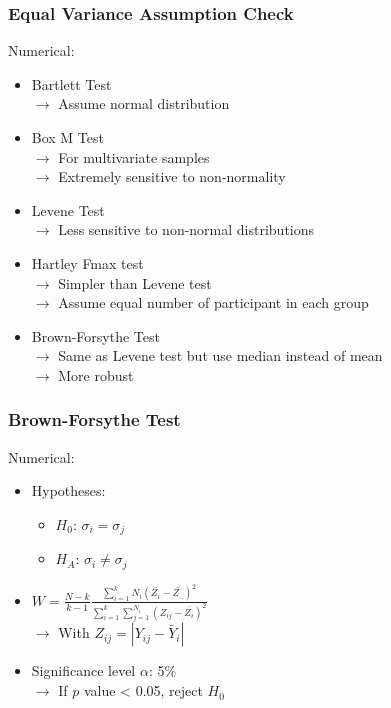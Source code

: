 \documentclass[xcolor=table]{beamer}
\begin{document}
\begin{frame}
	\frametitle{Equal Variance Assumption Check}
	Numerical:
	\begin{itemize}[label=$\bullet$]
		\item Bartlett Test\\
		$ \rightarrow $ Assume normal distribution
		\item Box M Test\\
		$ \rightarrow $ For multivariate samples\\
		$ \rightarrow $ Extremely sensitive to non-normality
		\item Levene Test\\
		$ \rightarrow $ Less sensitive to non-normal distributions
		\item Hartley Fmax test\\
		$ \rightarrow $ Simpler than Levene test\\
		$ \rightarrow $ Assume equal number of participant in each group
		\item Brown-Forsythe Test\\
		$ \rightarrow $ Same as Levene test but use median instead of mean\\
		$ \rightarrow $ More robust
	\end{itemize}
\end{frame}


\begin{frame}
	\frametitle{Brown-Forsythe Test}
	Numerical:
	\begin{itemize}[label=$\bullet$]
	\item Hypotheses:
	\begin{itemize}[label=$-$]
		\item $H_0$: $\sigma_i=\sigma_j$
		\item $H_A$: $\sigma_i\neq\sigma_j$
	\end{itemize}\vspace{1em}
	\item $W = \frac{N-k}{k-1}\frac{\sum_{i=1}^k N_i(\bar{Z_i} - \bar{Z_{..}})^2}{\sum_{i=1}^k \sum_{j=1}^{N_i}(Z_{ij} - \bar{Z_i})^2}$\\\vspace{2mm}
	$ \rightarrow $ With $Z_{ij} = |Y_{ij} - \tilde{Y_i}|$\vspace{1em}
	\item Significance level $\alpha$: 5\%\\
	$ \rightarrow $ If $p$ value < 0.05, reject $H_0$
\end{itemize}
\end{frame}
\end{document}
